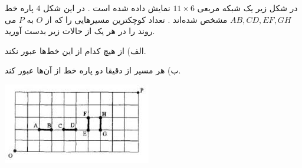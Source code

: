 \EXERCISE
در شکل زیر یک شبکه مربعی 
$11 \times 6$
نمایش داده شده است . در این شکل 
$4$
 پاره خط 
$AB, CD, EF, GH$
  مشخص شده‌اند . تعداد کوچکترین مسیرهایی را که از 
$O$
  به 
$P$
   می روند را در هر یک از
حالات زیر بدست آورید.

الف) از هیچ‌ کدام از این خط‌ها عبور نکند.

ب) هر مسیر از دقیقا دو پاره خط از آن‌ها عبور کند.

    \begin{center}
     	\includegraphics[scale=0.7]{./5.png}
    \end{center}